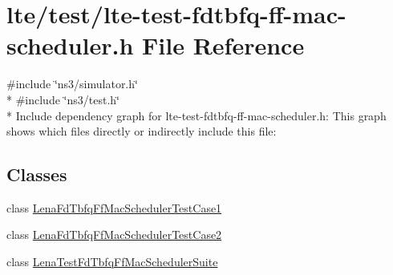 \hypertarget{lte-test-fdtbfq-ff-mac-scheduler_8h}{}\section{lte/test/lte-\/test-\/fdtbfq-\/ff-\/mac-\/scheduler.h File Reference}
\label{lte-test-fdtbfq-ff-mac-scheduler_8h}
{\ttfamily \#include \char`\"{}ns3/simulator.\+h\char`\"{}}\\*
{\ttfamily \#include \char`\"{}ns3/test.\+h\char`\"{}}\\*
Include dependency graph for lte-\/test-\/fdtbfq-\/ff-\/mac-\/scheduler.h\+:
This graph shows which files directly or indirectly include this file\+:
\subsection*{Classes}
\begin{DoxyCompactItemize}
\item 
class \hyperlink{classLenaFdTbfqFfMacSchedulerTestCase1}{Lena\+Fd\+Tbfq\+Ff\+Mac\+Scheduler\+Test\+Case1}
\item 
class \hyperlink{classLenaFdTbfqFfMacSchedulerTestCase2}{Lena\+Fd\+Tbfq\+Ff\+Mac\+Scheduler\+Test\+Case2}
\item 
class \hyperlink{classLenaTestFdTbfqFfMacSchedulerSuite}{Lena\+Test\+Fd\+Tbfq\+Ff\+Mac\+Scheduler\+Suite}
\end{DoxyCompactItemize}
